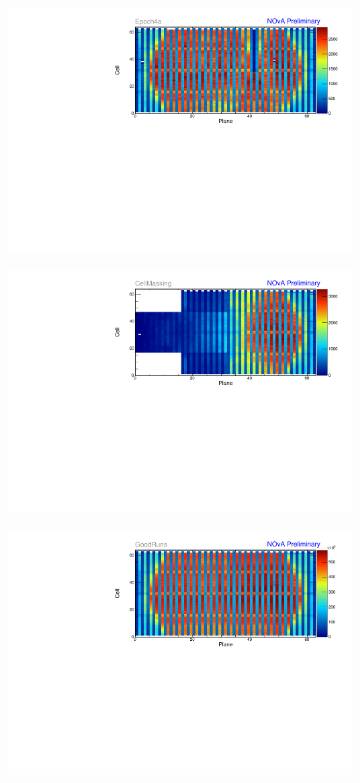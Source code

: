\begin{figure}[!hbtp]
\centering
\begin{subfigure}[b]{\textwidth}
\centering
\includegraphics[width=.9\textwidth]{PlotsTBCalibTechnote/Attenprofs_P4Data_CellPlane_Epoch4a.pdf}
\end{subfigure}
\begin{subfigure}[b]{\textwidth}
\centering
\includegraphics[width=.9\textwidth]{PlotsTBCalibTechnote/Attenprofs_P4Data_CellPlane_CellMasking.pdf}
\end{subfigure}
\begin{subfigure}[b]{\textwidth}
\centering
\includegraphics[width=.9\textwidth]{PlotsTBCalibTechnote/Attenprofs_P4Data_CellPlane_GoodRuns.pdf}

\end{subfigure}
\end{figure}
